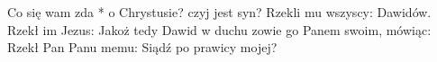 Co się wam zda * o Chrystusie? czyj jest syn? Rzekli mu wszyscy: Dawidów. Rzekł im Jezus: Jakoż tedy Dawid w duchu zowie go Panem swoim, mówiąc: Rzekł Pan Panu memu: Siądź po prawicy mojej?